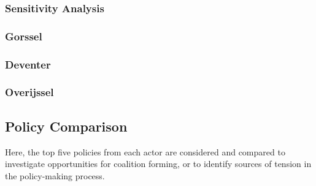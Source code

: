 \subsubsection{Sensitivity Analysis}

\subsubsection{Gorssel}
\subsubsection{Deventer}
\subsubsection{Overijssel}


\subsection{Policy Comparison}
Here, the top five policies from each actor are considered and compared to investigate opportunities for coalition forming, or to identify sources of tension in the policy-making process.